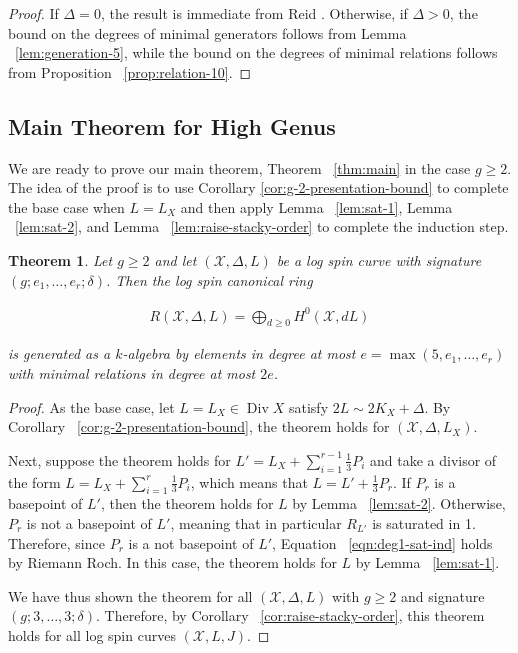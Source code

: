\documentclass{amsart}
\theoremstyle{plain}
\newtheorem{thm}{Theorem}[section]
\theoremstyle{definition}
\theoremstyle{remark}
\numberwithin{equation}{section}
\newcommand\ssec{\subsection}
\DeclareMathOperator\di{Div}
\newcommand\sx{\mathscr X}
\newcommand{\halfcan}{L}
\begin{document}
\begin{proof}
If $\Delta = 0$, the result is immediate from Reid \cite[Theorem 3.4]
{reid:infinitesimal}. Otherwise, if $\Delta > 0$, the bound on the
degrees of minimal generators follows from Lemma
~\ref{lem:generation-5}, while the bound on the degrees of minimal
relations follows from Proposition ~\ref{prop:relation-10}.
\end{proof}

\ssec{Main Theorem for High Genus}
\label{ssec:g-high-main}

We are ready to prove our main theorem, Theorem ~\ref{thm:main} in the case
$g \geq 2$. The idea of the proof is to use Corollary \ref{cor:g-2-presentation-bound} to 
complete the base case when $L = \halfcan_X$ and then apply Lemma
~\ref{lem:sat-1}, Lemma ~\ref{lem:sat-2}, and Lemma
~\ref{lem:raise-stacky-order} to complete the induction step.

\begin{thm}
\label{thm:g-high-main}
Let $g \geq 2$ and let $(\sx, \Delta, \halfcan)$ be a log spin curve 
with signature $(g; e_1, \ldots, e_r; \delta)$. Then the
log spin canonical ring

\begin{align*}
	R(\sx, \Delta, \halfcan) = \bigoplus_{d \geq 0} H^0(\sx, d L )
\end{align*}

\noindent
is generated as a $k$-algebra by elements in degree at most $e =
\max(5, e_1, \ldots, e_r)$ with minimal relations in degree at most $2e$.
\end{thm}

%

\begin{proof}
As the base case, let $\halfcan=\halfcan_X \in \di X$ satisfy $2\halfcan \sim 2 K_X + \Delta$.
By Corollary ~\ref{cor:g-2-presentation-bound}, the theorem holds for $(\sx, \Delta,
\halfcan_X)$. 

Next, suppose the theorem holds for $\halfcan' = \halfcan_X+ \sum_{i=1}^{r-1} \frac{1}{3}P_i$ and take a divisor of the form $\halfcan = \halfcan_X + \sum_{i=1}^r \frac{1}{3} P_i$, which means that $\halfcan = \halfcan' + \frac{1}{3} P_r$.  If $P_r$ is a basepoint of $L'$, then the theorem holds for $\halfcan$ by Lemma ~\ref{lem:sat-2}.  
Otherwise, $P_r$ is not a basepoint of $\halfcan'$, meaning that in particular $R_{\halfcan'}$ is saturated in 1.
Therefore, since $P_r$ is a not basepoint of $\halfcan'$, Equation
~\ref{eqn:deg1-sat-ind} holds by Riemann Roch.
In this case, the theorem holds for $L$ by Lemma ~\ref{lem:sat-1}.

We have thus shown the theorem for all $(\sx, \Delta, \halfcan)$ with $g\ge 2$ and signature $(g;3, \ldots, 3;\delta)$. Therefore, by Corollary 
~\ref{cor:raise-stacky-order}, this theorem 
holds for all log spin curves $(\sx, L, J)$. 
\end{proof}
\end{document}

